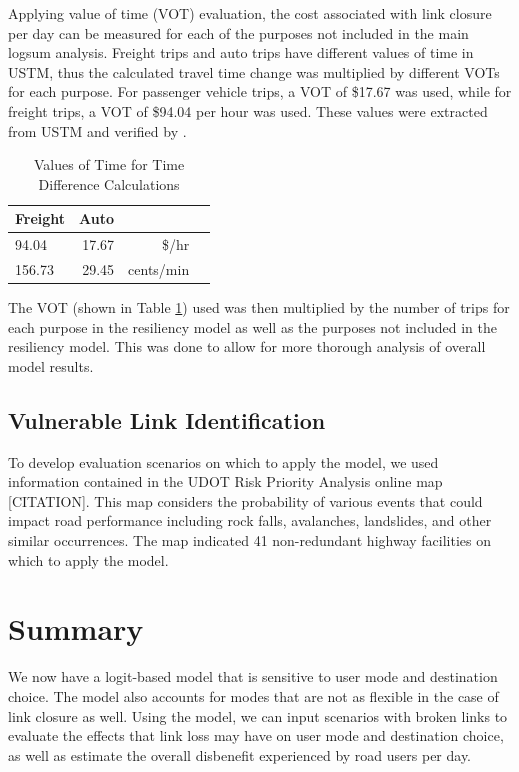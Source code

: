 Applying value of time (VOT) evaluation, the cost associated with link
closure per day can be measured for each of the purposes not included in
the main logsum analysis. Freight trips and auto trips have different
values of time in USTM, thus the calculated travel time change was
multiplied by different VOTs for each purpose. For passenger vehicle
trips, a VOT of \$17.67 was used, while for freight trips, a VOT of
\$94.04 per hour was used. These values were extracted from USTM and
verified by \cite{UtahDepartmentofTransportation2020}.

\begin{table}

\caption{\label{tab:VOT}Values of Time for Time Difference Calculations}
\centering
\begin{tabular}[t]{lrrr}
\toprule
Freight & Auto \\
\midrule
94.04 & 17.67 & \$/hr\\
156.73 & 29.45 & cents/min\\
\bottomrule
\end{tabular}
\end{table}

The VOT (shown in Table \ref{tab:VOT})  used was then multiplied by the
number of trips for each purpose in the resiliency model as well as the
purposes not included in the resiliency model. This was done to allow for
more thorough analysis of overall model results.

\subsection{Vulnerable Link Identification}

To develop evaluation scenarios on which to apply the model, we used
information
contained in the UDOT Risk Priority Analysis online map {[}CITATION{]}.
This map
considers the probability of various events that could impact road
performance
including rock falls, avalanches, landslides, and other similar
occurrences.
The map indicated 41 non-redundant highway facilities on which to apply
the model.

\section{Summary}

We now have a logit-based model that is sensitive to user mode and
destination choice. The model also accounts for modes that are not as
flexible in the case of link closure as well. Using the model, we can
input scenarios with broken links to evaluate the effects that link loss
may have on user mode and destination choice, as well as estimate the
overall disbenefit experienced by road users per day.
